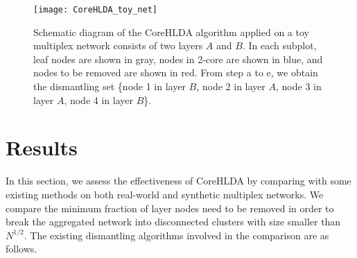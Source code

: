 \documentclass[%
 aip,
 cha,
 amsmath,amssymb,
 reprint,%
]{revtex4-1}
\begin{document}
\begin{figure*}
\centering
\texttt{[image: CoreHLDA\_toy\_net]}%
\caption{\label{fig:wide:CoreHLDA}Schematic diagram of the CoreHLDA algorithm applied on a toy multiplex network consists of two layers $A$ and $B$. In each subplot, leaf nodes are shown in gray, nodes in 2-core are shown in blue, and nodes to be removed are shown in red. From step a to e, we obtain the dismantling set \{node 1 in layer $B$, node 2 in layer $A$, node 3 in layer $A$, node 4 in layer $B$\}.}
\end{figure*}



\section{\label{sec4} Results}

In this section, we assess the effectiveness of CoreHLDA by comparing with some existing methods on both real-world and synthetic multiplex networks. We compare the minimum fraction of layer nodes need to be removed in order to break the aggregated network into disconnected clusters with size smaller than $N^{1/2}$. The existing dismantling algorithms involved in the comparison are as follows.
\end{document}
